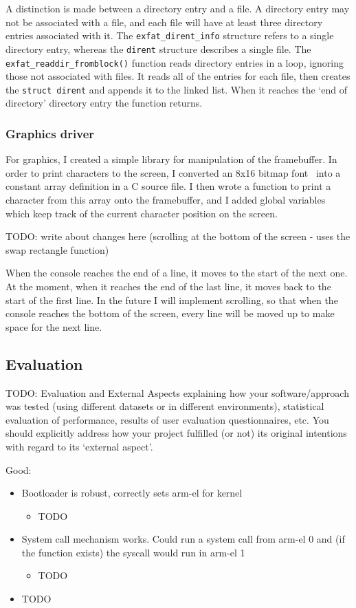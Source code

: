 \documentclass{article}
\begin{document}
A distinction is made between a directory entry and a file. A directory entry
may not be associated with a file, and each file will have at least three
directory entries associated with it. The \verb!exfat_dirent_info! structure
refers to a single directory entry, whereas the \verb!dirent! structure
describes a single file. The \verb!exfat_readdir_fromblock()! function reads
directory entries in a loop, ignoring those not associated with files. It reads
all of the entries for each file, then creates the \verb!struct dirent! and
appends it to the linked list. When it reaches the `end of directory' directory
entry the function returns.

\subsubsection{Graphics driver}
\label{sec:impl_graphics}
For graphics, I created a simple library for manipulation of the framebuffer.
In order to print characters to the screen, I converted an 8x16 bitmap
font~\cite{bizcat-font} into a constant array definition in a C source file. I
then wrote a function to print a character from this array onto the
framebuffer, and I added global variables which keep track of the current
character position on the screen.

TODO: write about changes here (scrolling at the bottom of the screen - uses
the swap rectangle function)

When the console reaches the end of a line, it moves to the start of the next
one. At the moment, when it reaches the end of the last line, it moves back to
the start of the first line. In the future I will implement scrolling, so that
when the console reaches the bottom of the screen, every line will be moved up
to make space for the next line.


\subsection{Evaluation}
TODO: Evaluation and External Aspects explaining how your software/approach was
tested (using different datasets or in different environments), statistical
evaluation of performance, results of user evaluation questionnaires, etc. You
should explicitly address how your project fulfilled (or not) its original
intentions with regard to its `external aspect'.

Good:
\begin{itemize}
    \item Bootloader is robust, correctly sets \gls{arm-el} for kernel
        \begin{itemize}
            \item TODO
        \end{itemize}
    \item System call mechanism works. Could run a system call from
        \gls{arm-el} 0 and (if the function exists) the syscall would run in
        \gls{arm-el} 1
        \begin{itemize}
            \item TODO
        \end{itemize}
    \item TODO
\end{itemize}
\end{document}
